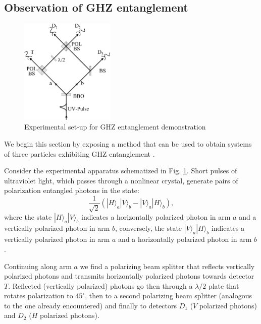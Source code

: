 \subsection{Observation of GHZ entanglement}

\begin{figure}
  \centering
  \includegraphics[width=0.4\textwidth]{Mainmatter/Chapter3/ghz-entanglement.png}
  \caption{Experimental set-up for GHZ entanglement demonstration}
  \label{fig:ghz-entanglement}
\end{figure}

We begin this section by exposing a method that can be used to obtain systems of three particles exhibiting GHZ entanglement \cite{PhysRevLett.82.1345}.

Consider the experimental apparatus schematized in Fig. \ref{fig:ghz-entanglement}. Short pulses of ultraviolet light, which passes through a nonlinear crystal, generate pairs of polarization entangled photons in the state:
\begin{equation}
  \frac{1}{\sqrt{2}} \left( |H\rangle_a |V\rangle_b - |V\rangle_a |H\rangle_b \right),
\end{equation}
where the state $|H\rangle_a |V\rangle_b$ indicates a horizontally polarized photon in arm $a$ and a vertically polarized photon in arm $b$, conversely, the state $|V\rangle_a |H\rangle_b$ indicates a vertically polarized photon in arm $a$ and a horizontally polarized photon in arm $b$.

Continuing along arm $a$ we find a polarizing beam splitter that reflects vertically polarized photons and transmits horizontally polarized photons towards detector $T$. Reflected (vertically polarized) photons go then through a $\lambda/2$ plate that rotates polarization to $45^\circ$, then to a second polarizing beam splitter (analogous to the one already encountered) and finally to detectors $D_1$ ($V$ polarized photons) and $D_2$ ($H$ polarized photons).

